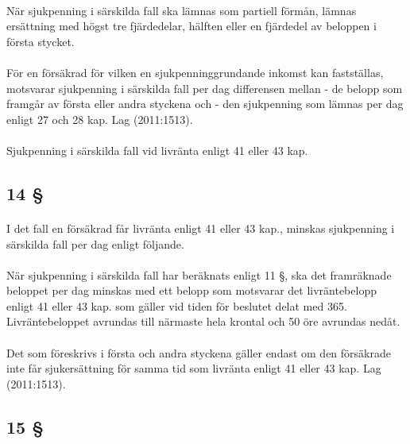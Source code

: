 \documentclass[a4paper,notitlepage,openany,10pt]{book}
\begin{document}
\paragraph*{}
När sjukpenning i särskilda fall ska lämnas som partiell förmån, lämnas ersättning med högst tre fjärdedelar, hälften eller en fjärdedel av beloppen i första stycket.
\paragraph*{}
För en försäkrad för vilken en sjukpenninggrundande inkomst kan fastställas, motsvarar sjukpenning i särskilda fall per dag differensen mellan
\newline - de belopp som framgår av första eller andra styckena och
\newline - den sjukpenning som lämnas per dag enligt 27 och 28 kap.
Lag (2011:1513).
\paragraph*{}
Sjukpenning i särskilda fall vid livränta enligt 41 eller 43 kap.
\subsection*{14 §}
\paragraph*{}
I det fall en försäkrad får livränta enligt 41 eller 43 kap., minskas sjukpenning i särskilda fall per dag enligt följande.
\paragraph*{}
När sjukpenning i särskilda fall har beräknats enligt 11 §, ska det framräknade beloppet per dag minskas med ett belopp som motsvarar det livräntebelopp enligt 41 eller 43 kap. som gäller vid tiden för beslutet delat med 365. Livräntebeloppet avrundas till närmaste hela krontal och 50 öre avrundas nedåt.
\paragraph*{}
Det som föreskrivs i första och andra styckena gäller endast om den försäkrade inte får sjukersättning för samma tid som livränta enligt 41 eller 43 kap.
Lag (2011:1513).
\subsection*{15 §}
\end{document}
